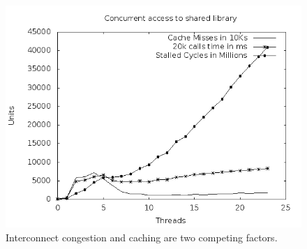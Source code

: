 \begin{figure}
    \centering
    \includegraphics[scale=0.39]{explaination.png}
    \caption{Interconnect congestion and caching are two competing factors. }
    \label{fig:explaination.png}
\end{figure}


